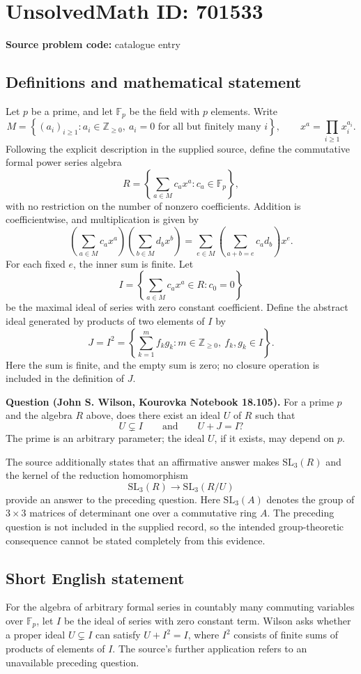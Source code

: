 \documentclass[11pt]{article}
\newcommand{\Z}{\mathbb{Z}}
\newcommand{\F}{\mathbb{F}}
\begin{document}
\section*{UnsolvedMath ID: 701533}
\textbf{Source problem code:} catalogue entry
\subsection{Definitions and mathematical statement}
Let \(p\) be a prime, and let \(\F_p\) be the field with \(p\) elements. Write
\[
M=\left\{(a_i)_{i\geq 1}:a_i\in\Z_{\geq 0},\ a_i=0\text{ for all but finitely many }i\right\},
\qquad x^a=\prod_{i\geq 1}x_i^{a_i}.
\]
Following the explicit description in the supplied source, define the commutative formal power series algebra
\[
R=\left\{\sum_{a\in M}c_a x^a:c_a\in\F_p\right\},
\]
with no restriction on the number of nonzero coefficients. Addition is coefficientwise, and multiplication is given by
\[
\left(\sum_{a\in M}c_a x^a\right)\left(\sum_{b\in M}d_b x^b\right)
=\sum_{e\in M}\left(\sum_{a+b=e}c_a d_b\right)x^e.
\]
For each fixed \(e\), the inner sum is finite. Let
\[
I=\left\{\sum_{a\in M}c_a x^a\in R:c_0=0\right\}
\]
be the maximal ideal of series with zero constant coefficient. Define the abstract ideal generated by products of two elements of \(I\) by
\[
J=I^2=\left\{\sum_{k=1}^{m}f_k g_k:m\in\Z_{\geq 0},\ f_k,g_k\in I\right\}.
\]
Here the sum is finite, and the empty sum is zero; no closure operation is included in the definition of \(J\).

\textbf{Question (John S. Wilson, Kourovka Notebook 18.105).} For a prime \(p\) and the algebra \(R\) above, does there exist an ideal \(U\) of \(R\) such that
\[
U\subsetneq I
\qquad\text{and}\qquad
U+J=I?
\]
The prime is an arbitrary parameter; the ideal \(U\), if it exists, may depend on \(p\).

The source additionally states that an affirmative answer makes \(\mathrm{SL}_3(R)\) and the kernel of the reduction homomorphism
\[
\mathrm{SL}_3(R)\longrightarrow\mathrm{SL}_3(R/U)
\]
provide an answer to the preceding question. Here \(\mathrm{SL}_3(A)\) denotes the group of \(3\times3\) matrices of determinant one over a commutative ring \(A\). The preceding question is not included in the supplied record, so the intended group-theoretic consequence cannot be stated completely from this evidence.
\subsection{Short English statement}
For the algebra of arbitrary formal series in countably many commuting variables over \(\F_p\), let \(I\) be the ideal of series with zero constant term. Wilson asks whether a proper ideal \(U\subsetneq I\) can satisfy \(U+I^2=I\), where \(I^2\) consists of finite sums of products of elements of \(I\). The source's further application refers to an unavailable preceding question.
\end{document}

